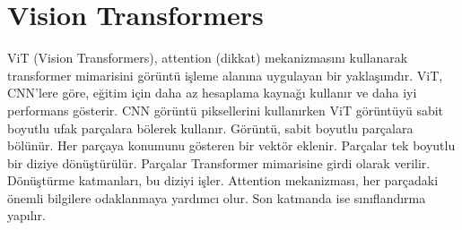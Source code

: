 \section{Vision Transformers}
ViT (Vision Transformers), attention (dikkat) mekanizmasını kullanarak transformer mimarisini görüntü işleme alanına uygulayan bir yaklaşımdır. ViT, CNN'lere göre, eğitim için daha az hesaplama kaynağı kullanır ve daha iyi performans gösterir. CNN görüntü piksellerini kullanırken ViT görüntüyü sabit boyutlu ufak parçalara bölerek kullanır. Görüntü, sabit boyutlu parçalara bölünür. Her parçaya konumunu gösteren bir vektör eklenir. Parçalar tek boyutlu bir diziye dönüştürülür. Parçalar Transformer mimarisine girdi olarak verilir. Dönüştürme katmanları, bu diziyi işler. Attention mekanizması, her parçadaki önemli bilgilere odaklanmaya yardımcı olur. Son katmanda ise sınıflandırma yapılır.

\newpage